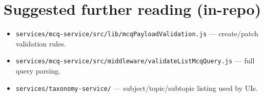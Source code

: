 \documentclass[11pt,a4paper]{article}
\begin{document}
\section{Suggested further reading (in-repo)}

\begin{itemize}[nosep]
  \item \texttt{services/mcq-service/src/lib/mcqPayloadValidation.js} --- create/patch validation rules.
  \item \texttt{services/mcq-service/src/middleware/validateListMcqQuery.js} --- full query parsing.
  \item \texttt{services/taxonomy-service/} --- subject/topic/subtopic listing used by UIs.
\end{itemize}
\end{document}

